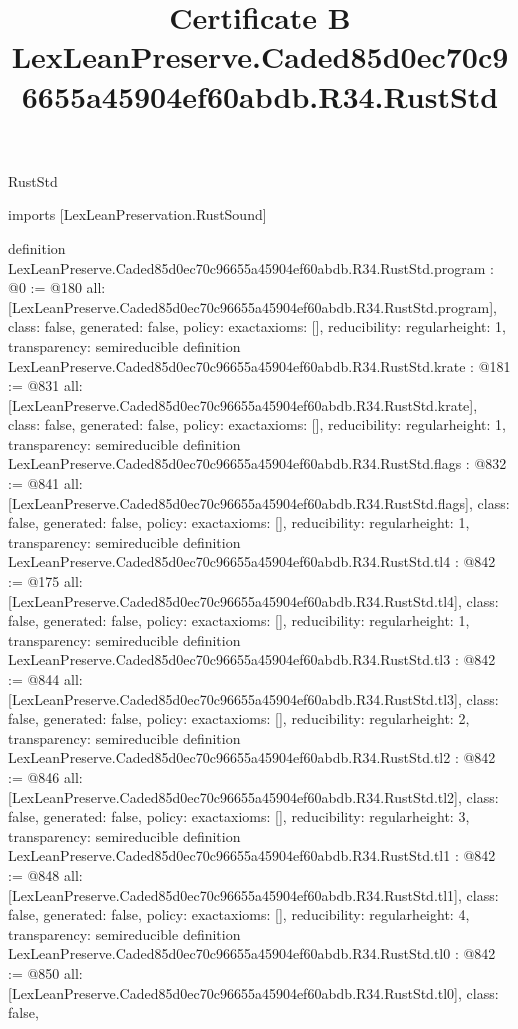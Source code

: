 \begin{lexlean}{RustStd}
\title{Certificate B LexLeanPreserve.Caded85d0ec70c96655a45904ef60abdb.R34.RustStd}
\begin{coremodule}
imports [LexLeanPreservation.RustSound]

definition LexLeanPreserve.Caded85d0ec70c96655a45904ef60abdb.R34.RustStd.program : @0 := @180 {
  all: [LexLeanPreserve.Caded85d0ec70c96655a45904ef60abdb.R34.RustStd.program],
  class: false,
  generated: false,
  policy: exact{axioms: []},
  reducibility: regular{height: 1},
  transparency: semireducible
}
definition LexLeanPreserve.Caded85d0ec70c96655a45904ef60abdb.R34.RustStd.krate : @181 := @831 {
  all: [LexLeanPreserve.Caded85d0ec70c96655a45904ef60abdb.R34.RustStd.krate],
  class: false,
  generated: false,
  policy: exact{axioms: []},
  reducibility: regular{height: 1},
  transparency: semireducible
}
definition LexLeanPreserve.Caded85d0ec70c96655a45904ef60abdb.R34.RustStd.flags : @832 := @841 {
  all: [LexLeanPreserve.Caded85d0ec70c96655a45904ef60abdb.R34.RustStd.flags],
  class: false,
  generated: false,
  policy: exact{axioms: []},
  reducibility: regular{height: 1},
  transparency: semireducible
}
definition LexLeanPreserve.Caded85d0ec70c96655a45904ef60abdb.R34.RustStd.tl4 : @842 := @175 {
  all: [LexLeanPreserve.Caded85d0ec70c96655a45904ef60abdb.R34.RustStd.tl4],
  class: false,
  generated: false,
  policy: exact{axioms: []},
  reducibility: regular{height: 1},
  transparency: semireducible
}
definition LexLeanPreserve.Caded85d0ec70c96655a45904ef60abdb.R34.RustStd.tl3 : @842 := @844 {
  all: [LexLeanPreserve.Caded85d0ec70c96655a45904ef60abdb.R34.RustStd.tl3],
  class: false,
  generated: false,
  policy: exact{axioms: []},
  reducibility: regular{height: 2},
  transparency: semireducible
}
definition LexLeanPreserve.Caded85d0ec70c96655a45904ef60abdb.R34.RustStd.tl2 : @842 := @846 {
  all: [LexLeanPreserve.Caded85d0ec70c96655a45904ef60abdb.R34.RustStd.tl2],
  class: false,
  generated: false,
  policy: exact{axioms: []},
  reducibility: regular{height: 3},
  transparency: semireducible
}
definition LexLeanPreserve.Caded85d0ec70c96655a45904ef60abdb.R34.RustStd.tl1 : @842 := @848 {
  all: [LexLeanPreserve.Caded85d0ec70c96655a45904ef60abdb.R34.RustStd.tl1],
  class: false,
  generated: false,
  policy: exact{axioms: []},
  reducibility: regular{height: 4},
  transparency: semireducible
}
definition LexLeanPreserve.Caded85d0ec70c96655a45904ef60abdb.R34.RustStd.tl0 : @842 := @850 {
  all: [LexLeanPreserve.Caded85d0ec70c96655a45904ef60abdb.R34.RustStd.tl0],
  class: false,
}
\end{coremodule}
\end{lexlean}
